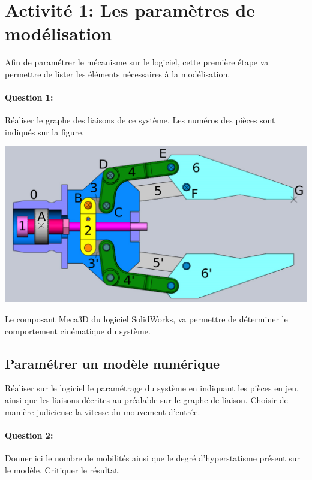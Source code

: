 

\section{Activité 1: Les paramètres de modélisation}

\begin{minipage}{0.45\linewidth}
Afin de paramétrer le mécanisme sur le logiciel, cette première étape va permettre de lister les éléments nécessaires à la modélisation.


\paragraph{Question 1:} Réaliser le graphe des liaisons de ce système. Les numéros des pièces sont indiqués sur la figure. 
\end{minipage}
\hfill
\begin{minipage}{0.48\linewidth}
	\includegraphics[width=0.9\linewidth]{img/Pince_pieces}
\end{minipage}

\vspace{5cm}

Le composant \og Meca3D \fg du logiciel SolidWorks, va permettre de déterminer le comportement cinématique du système.

\subsection{Paramétrer un modèle numérique}

Réaliser sur le logiciel le paramétrage du système en indiquant les pièces en jeu, ainsi que les liaisons décrites au préalable sur le graphe de liaison. Choisir de manière judicieuse la vitesse du mouvement d'entrée.

\paragraph{Question 2:} Donner ici le nombre de mobilités ainsi que le degré d'hyperstatisme présent sur le modèle. Critiquer le résultat.

